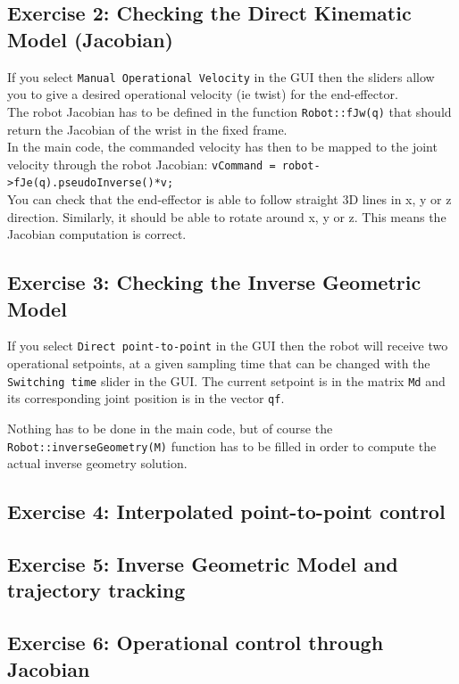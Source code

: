 \documentclass{ecnreport}
\begin{document}
\subsection*{Exercise 2: Checking the Direct Kinematic Model (Jacobian)}

If you select \texttt{Manual Operational Velocity} in the GUI then the sliders allow you to give a desired operational velocity (ie twist) for the end-effector.\\
The robot Jacobian has to be defined in the function \texttt{Robot::fJw(q)} that should return the Jacobian of the wrist in the fixed frame.\\

In the main code, the commanded velocity has then to be mapped to the joint velocity through the robot Jacobian: \texttt{vCommand = robot->fJe(q).pseudoInverse()*v;}\\
You can check that the end-effector is able to follow straight 3D lines in x, y or z direction. Similarly, it should be able to rotate around x, y or z. This means the Jacobian computation is correct.

\subsection*{Exercise 3: Checking the Inverse Geometric Model}

If you select \texttt{Direct point-to-point} in the GUI then the robot will receive two operational setpoints, at a given sampling time that can be changed with the \texttt{Switching time} slider in the GUI. The current setpoint is in the matrix \texttt{Md} and its corresponding joint position is in the vector \texttt{qf}. 

Nothing has to be done in the main code, but of course the \texttt{Robot::inverseGeometry(M)} function has to be filled in order to compute the actual inverse geometry solution.

\subsection*{Exercise 4: Interpolated point-to-point control}

\subsection*{Exercise 5: Inverse Geometric Model and trajectory tracking}

\subsection*{Exercise 6: Operational control through Jacobian}
\end{document}
